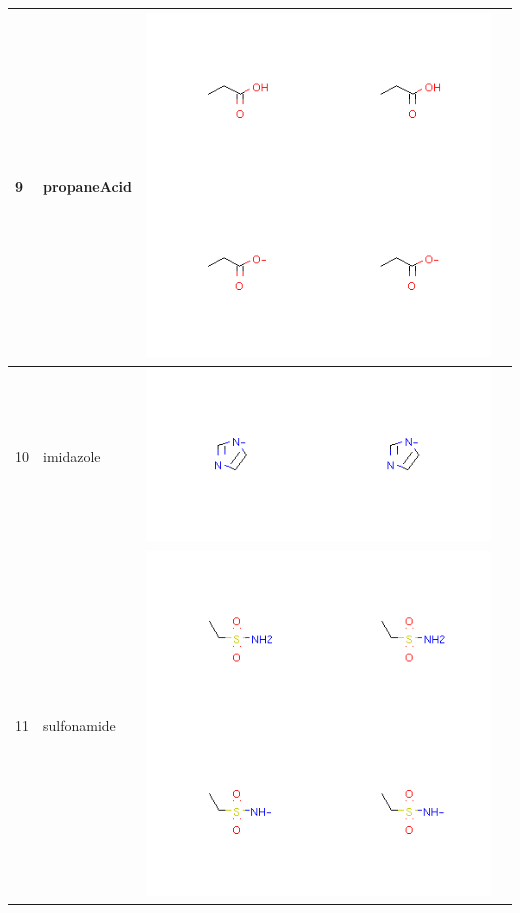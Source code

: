 \begin{longtable}{|l|l|l|l|}
\hline
9 & propaneAcid & \includegraphics[scale=0.6]{propaneAcid.png} & \\
\hline
10 & imidazole & \includegraphics[scale=0.6]{imidazole.png} & \\
\hline
11 & sulfonamide & \includegraphics[scale=0.6]{sulfonamide.png} & \\

\end{longtable}
